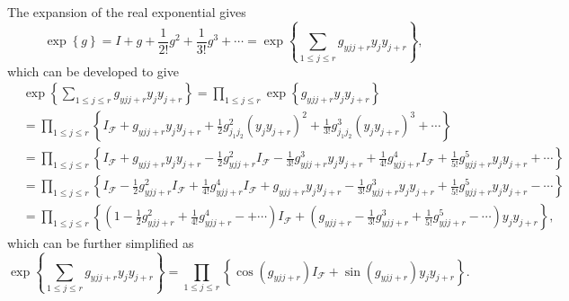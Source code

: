 \documentclass[aps,preprint]{revtex4}%
\begin{document}
The expansion of the real exponential gives
\begin{equation}
\exp\left\{  g\right\}  =I+g+\frac{1}{2!}g^{2}+\frac{1}{3!}g^{3}+\cdots
=\exp\left\{
{\textstyle\sum\limits_{1\leq j\leq r}}
\mathit{g}_{yjj+r}y_{j}y_{j+r}\right\}  ,
\end{equation}
which can be developed to give
\begin{align}
&  \exp\left\{
{\textstyle\sum\limits_{1\leq j\leq r}}
\mathit{g}_{yjj+r}y_{j}y_{j+r}\right\}  =%
{\textstyle\prod\limits_{1\leq j\leq r}}
\exp\left\{  \mathit{g}_{yjj+r}y_{j}y_{j+r}\right\}  \\
&  =%
{\textstyle\prod\limits_{1\leq j\leq r}}
\left\{  I_{\mathcal{F}}+\mathit{g}_{yjj+r}y_{j}y_{j+r}+\frac{1}{2}%
\mathit{g}_{j_{1}j_{2}}^{2}\left(  y_{j}y_{j+r}\right)  ^{2}+\frac{1}%
{3!}\mathit{g}_{j_{1}j_{2}}^{3}\left(  y_{j}y_{j+r}\right)  ^{3}%
+\cdots\right\}  \\
&  =%
{\textstyle\prod\limits_{1\leq j\leq r}}
\left\{  I_{\mathcal{F}}+\mathit{g}_{yjj+r}y_{j}y_{j+r}-\frac{1}{2}%
\mathit{g}_{yjj+r}^{2}I_{\mathcal{F}}-\frac{1}{3!}\mathit{g}_{yjj+r}^{3}%
y_{j}y_{j+r}+\frac{1}{4!}\mathit{g}_{yjj+r}^{4}I_{\mathcal{F}}+\frac{1}%
{5!}\mathit{g}_{yjj+r}^{5}y_{j}y_{j+r}+\cdots\right\}  \\
&  =%
{\textstyle\prod\limits_{1\leq j\leq r}}
\left\{  I_{\mathcal{F}}-\frac{1}{2}\mathit{g}_{yjj+r}^{2}I_{\mathcal{F}%
}+\frac{1}{4!}\mathit{g}_{yjj+r}^{4}I_{\mathcal{F}}+\mathit{g}_{yjj+r}%
y_{j}y_{j+r}-\frac{1}{3!}\mathit{g}_{yjj+r}^{3}y_{j}y_{j+r}+\frac{1}%
{5!}\mathit{g}_{yjj+r}^{5}y_{j}y_{j+r}-\cdots\right\}  \\
&  =%
{\textstyle\prod\limits_{1\leq j\leq r}}
\left\{  \left(  1-\frac{1}{2}\mathit{g}_{yjj+r}^{2}+\frac{1}{4!}%
\mathit{g}_{yjj+r}^{4}-+\cdots\right)  I_{\mathcal{F}}+\left(  \mathit{g}%
_{yjj+r}-\frac{1}{3!}\mathit{g}_{yjj+r}^{3}+\frac{1}{5!}\mathit{g}_{yjj+r}%
^{5}-\cdots\right)  y_{j}y_{j+r}\right\}  ,
\end{align}
which can be further simplified as
\begin{equation}
\exp\left\{
{\textstyle\sum\limits_{1\leq j\leq r}}
\mathit{g}_{yjj+r}y_{j}y_{j+r}\right\}  =%
{\textstyle\prod\limits_{1\leq j\leq r}}
\left\{  \cos\left(  \mathit{g}_{yjj+r}\right)  I_{\mathcal{F}}+\sin\left(
\mathit{g}_{yjj+r}\right)  y_{j}y_{j+r}\right\}  .
\end{equation}
\end{document}
